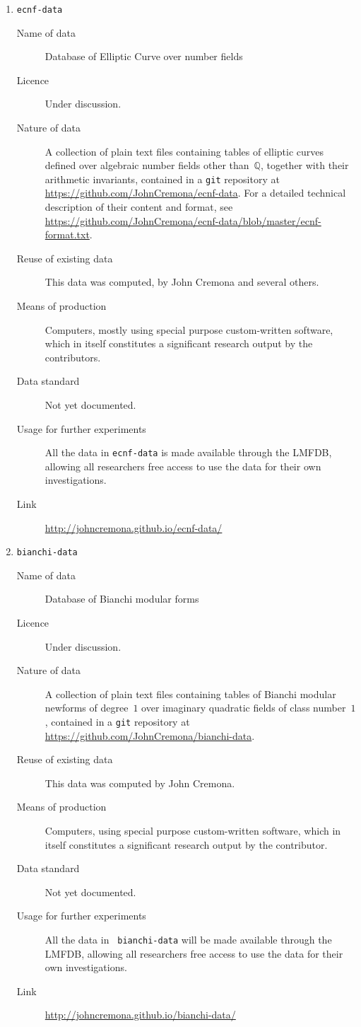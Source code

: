 \documentclass[12pt]{article}
\newcommand{\Q}{\(\mathbb{Q}\)}
\begin{document}
\begin{enumerate}
\item{{\tt ecnf-data}}
\begin{description}
\item[Name of data] Database of Elliptic Curve over number fields
\item[Licence]  Under discussion.
\item[Nature of data] A collection of plain text files containing
  tables of elliptic curves defined over algebraic number fields other
  than~\Q, together with their arithmetic invariants, contained in a
  {\tt git} repository at \url{https://github.com/JohnCremona/ecnf-data}.
  For a detailed technical description of their content and format,
  see \url{https://github.com/JohnCremona/ecnf-data/blob/master/ecnf-format.txt}.
\item[Reuse of existing data] This data was computed, by John Cremona
  and several others.
\item[Means of production] Computers, mostly using special purpose
  custom-written software, which in itself constitutes a significant
  research output by the contributors.
\item[Data standard] Not yet documented.
\item [Usage for further experiments] All the data in {\tt ecnf-data}
  is made available through the LMFDB, allowing all researchers free
  access to use the data for their own investigations.
\item [Link] \url{http://johncremona.github.io/ecnf-data/}
\end{description}

\item{{\tt bianchi-data}}
\begin{description}
\item[Name of data] Database of Bianchi modular forms
\item[Licence]  Under discussion.
\item[Nature of data] A collection of plain text files containing
  tables of Bianchi modular newforms of degree~$1$ over imaginary
  quadratic fields of class number~$1$, contained in a
  {\tt git} repository at \url{https://github.com/JohnCremona/bianchi-data}.
\item[Reuse of existing data] This data was computed by John Cremona.
\item[Means of production] Computers, using special purpose
  custom-written software, which in itself constitutes a significant
  research output by the contributor.
\item[Data standard] Not yet documented.
\item [Usage for further experiments] All the data in {\tt
  bianchi-data} will be made available through the LMFDB, allowing all
  researchers free access to use the data for their own
  investigations.
\item [Link] \url{http://johncremona.github.io/bianchi-data/}
\end{description}



\end{enumerate}
\end{document}
